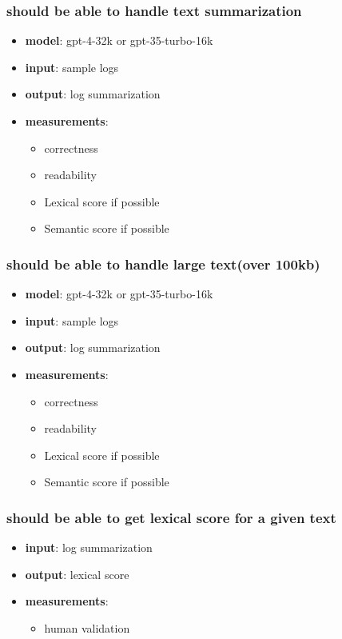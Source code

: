 \documentclass[conference]{IEEEtran}
\begin{document}
\subsubsection{should be able to handle text summarization}
\begin{itemize}
    \item \textbf{model}: gpt-4-32k or gpt-35-turbo-16k 
    \item \textbf{input}: sample logs
    \item \textbf{output}: log summarization
    \item \textbf{measurements}:
    \begin{itemize}
        \item correctness
        \item readability
        \item Lexical score if possible
        \item Semantic score if possible
    \end{itemize}
\end{itemize}

\subsubsection{should be able to handle large text(over 100kb)}
\begin{itemize}
    \item \textbf{model}: gpt-4-32k or gpt-35-turbo-16k 
    \item \textbf{input}: sample logs
    \item \textbf{output}: log summarization
    \item \textbf{measurements}:
    \begin{itemize}
        \item correctness
        \item readability
        \item Lexical score if possible
        \item Semantic score if possible
    \end{itemize}
\end{itemize}


\subsubsection{should be able to get lexical score for a given text}
\begin{itemize}
    \item \textbf{input}: log summarization
    \item \textbf{output}: lexical score 
    \item \textbf{measurements}:
    \begin{itemize}
        \item human validation
    \end{itemize}
\end{itemize}
\end{document}
